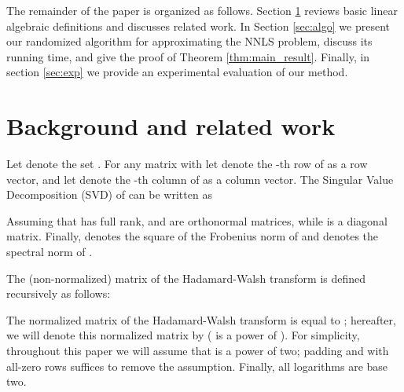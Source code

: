 \documentclass[11pt]{article}
\begin{document}
The remainder of the paper is organized as follows. Section
\ref{sec:priorwork} reviews basic linear algebraic definitions and
discusses related work. In Section \ref{sec:algo} we present our
randomized algorithm for approximating the NNLS problem, discuss
its running time, and give the proof of Theorem
\ref{thm:main_result}. Finally, in section \ref{sec:exp} we
provide an experimental evaluation of our method.

\section{Background and related work} \label{sec:priorwork}
Let  denote the set . For any matrix  with  let 
denote the -th row of  as a row vector, and let  denote the -th column of  as a column vector. The
Singular Value Decomposition (SVD) of  can be written as

Assuming that  has full rank, 
and   are orthonormal matrices,
while  is a  diagonal matrix. Finally,  denotes the
square of the Frobenius norm of  and  denotes the spectral
norm of .

The (non-normalized)  matrix of the Hadamard-Walsh
transform  is defined recursively as follows:

The  normalized matrix of the Hadamard-Walsh transform
is equal to ; hereafter, we will denote
this normalized matrix by  ( is a power of ). For
simplicity, throughout this paper we will assume that  is a
power of two; padding  and  with all-zero rows suffices to
remove the assumption. Finally, all logarithms are base two.
\end{document}
